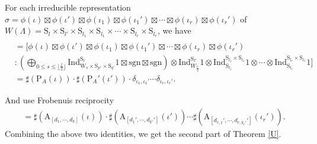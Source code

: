 \documentclass[12pt, a4paper]{amsart}
\numberwithin{equation}{section}
\newcommand{\CK}{{\mathcal {K}}}
\newcommand{\Ind}{{\mathrm{Ind}}}
\newcommand{\sgn}{{\mathrm{sgn}}}
\begin{document}
For each irreducible representation $\sigma = \phi(\iota) \boxtimes \phi(\iota') \boxtimes \phi(\iota_1) \boxtimes \phi(\iota_1') \boxtimes \cdots \boxtimes \phi(\iota_r) \boxtimes \phi(\iota_r')$ of $W(\Lambda) = \mathrm{S}_{l} \times \mathrm{S}_{l'} \times \mathrm{S}_{l_1} \times \mathrm{S}_{l_1} \times \cdots \times \mathrm{S}_{l_r} \times \mathrm{S}_{l_r}$, we have
\begin{align*}
    [\sigma: &\mathrm{Coh}_{\Lambda}(\CK(G))]\\
    &= [\phi(\iota) \boxtimes \phi(\iota') \boxtimes \phi(\iota_1) \boxtimes \phi(\iota_1') \boxtimes \cdots \boxtimes \phi(\iota_r) \boxtimes \phi(\iota_r')\\
    &:(\bigoplus_{0 \leq s \leq \lfloor\frac{l}{2}\rfloor}\Ind _{\mathrm{W}_{s} \times \mathrm{S}_{p'} \times \mathrm{S}_{q'}}^{\mathrm{S}_{l}}1 \boxtimes \sgn \boxtimes \sgn ) \otimes \Ind_{W_{\frac{l'}{2}}}^{\mathrm{S}_{l'}} 1 \otimes \Ind_{\mathrm{S}_{l_1}}^{\mathrm{S}_{l_1}\times \mathrm{S}_{l_1}}1 \otimes \cdots \otimes \Ind_{\mathrm{S}_{l_r}}^{\mathrm{S}_{l_r}\times \mathrm{S}_{l_r}}1]\\
    & = \sharp(\mathrm{P}_A(\iota))\cdot \sharp(\mathrm{P}_{A}'(\iota'))\cdot \delta_{\iota_1,\iota_1'} \cdots \delta_{\iota_r,\iota_r'}. 
\end{align*}

And use Frobenuis reciprocity
\begin{align*}
    [1_{W_{\nu}}: \sigma] = \sharp(\mathrm{A}_{[d_1,\cdots,d_k]}(\iota))\cdot \sharp(\mathrm{A}_{[d_1',\cdots,d_{k'}']}(\iota'))\cdots \sharp(\mathrm{A}_{[d_{r,1}',\cdots,d_{r,k_r'}']}(\iota_r')).
\end{align*}
Combining the above two identities, we get the second part of Theorem \ref{U}.
\end{document}
